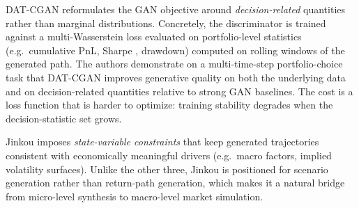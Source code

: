 DAT-CGAN \citep{DAT-CGAN} reformulates the GAN objective around \emph{decision-related} quantities rather than marginal distributions. Concretely, the discriminator is trained against a multi-Wasserstein loss evaluated on portfolio-level statistics (e.g.\ cumulative PnL, Sharpe , drawdown) computed on rolling windows of the generated path. The authors demonstrate on a multi-time-step portfolio-choice task that DAT-CGAN improves generative quality on both the underlying data and on decision-related quantities relative to strong GAN baselines. The cost is a loss function that is harder to optimize: training stability degrades when the decision-statistic set grows.

Jinkou \citep{Jinkou} imposes \emph{state-variable constraints} that keep generated trajectories consistent with economically meaningful drivers (e.g.\ macro factors, implied volatility surfaces). Unlike the other three, Jinkou is positioned for scenario generation rather than return-path generation, which makes it a natural bridge from micro-level synthesis to macro-level market simulation.

